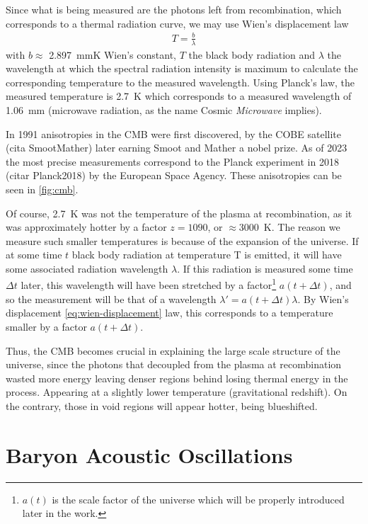 Since what is being measured are the photons left from recombination, which corresponds to a thermal radiation curve, we may use Wien's displacement law 
\begin{align}
	T = \frac{b}{\lambda}
	\label{eq:wien-displacement}
\end{align}
with $b\approx $ \SI{2.897}{mmK} Wien's constant, $T$ the black body radiation and $\lambda$ the wavelength at which the spectral radiation intensity is maximum to calculate the corresponding temperature to the measured wavelength. Using Planck's law, the measured temperature is \SI{2.7}{K} which corresponds to a measured wavelength of \SI{1.06}{mm} (microwave radiation, as the name Cosmic \textit{Microwave} implies).

In 1991 anisotropies in the CMB were first discovered, by the COBE satellite (cita SmootMather) later earning Smoot and Mather a nobel prize. As of 2023 the most precise measurements correspond to the Planck experiment in 2018 (citar Planck2018) by the European Space Agency. These anisotropies can be seen in \ref{fig:cmb}.

Of course, \SI{2.7}{K} was not the temperature of the plasma at recombination, as it was approximately hotter by a factor $z=1090$, or $\approx$\SI{3000}{K}. The reason we measure such smaller temperatures is because of the expansion of the universe.
If at some time $t$ black body radiation at temperature T is emitted, it will have some associated radiation wavelength $\lambda$. If this radiation is measured some time $\Delta t$ later, this wavelength will have been stretched by a factor\footnote{$a(t)$ is the scale factor of the universe which will be properly introduced later in the work.} $a(t + \Delta t)$, and so the measurement will be that of a wavelength $\lambda' = a(t+\Delta t) \lambda$. By Wien's displacement \eqref{eq:wien-displacement} law, this corresponds to a temperature smaller by a factor $a(t+\Delta t)$.

Thus, the CMB becomes crucial in explaining the large scale structure of the universe, since the photons that decoupled from the plasma at recombination wasted more energy leaving denser regions behind losing thermal energy in the process. Appearing at a slightly lower temperature (gravitational redshift). On the contrary, those in void regions will appear hotter, being blueshifted.

\section{Baryon Acoustic Oscillations}

